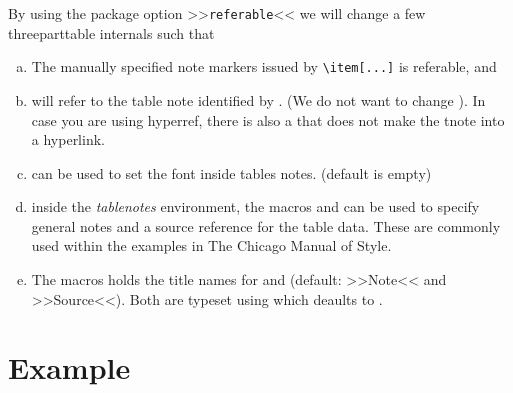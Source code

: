 \documentclass[a4paper,article]{memoir}
\newcommand\tpt{threeparttable\xspace}
\begin{document}
By using the package option >>\texttt{referable}<< we will change a
few \tpt internals such that
\begin{enumerate}[(a)]
\item The manually specified note markers issued by \verb+\item[...]+
  is referable, and
\item {} will refer to the table note identified
  by . (We do not want to change ). In case you
  are using hyperref, there is also a  that does not make
  the tnote into a hyperlink.
\item {} can be used to set the
  font inside tables notes. (default is empty)
\item inside the \emph{tablenotes} environment, the macros 
  and  can be used to specify general notes and a source
  reference for the table data. These are commonly used within the
  examples in The Chicago Manual of Style.
\item The macros   holds the title
  names for  and  (default: >>Note<< and
  >>Source<<). Both are typeset using 
  which deaults to .
\end{enumerate}

\section{Example}
\label{sec:example}
\end{document}
